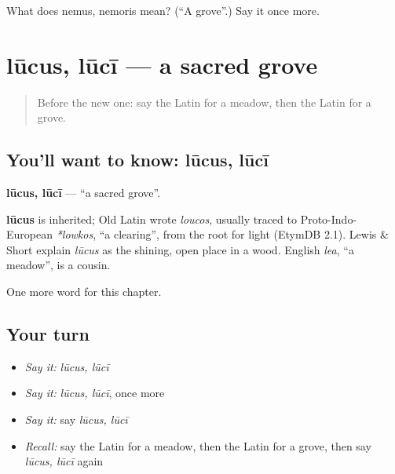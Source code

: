 \begin{tcolorbox}[breakable,colback=teal!4,colframe=teal!35!black,title={Before you move on}]
What does nemus, nemoris mean? (\textquotedblleft{}A grove\textquotedblright{}.) Say it once more.
\end{tcolorbox}
\section[lūcus, lūcī]{lūcus, lūcī — a sacred grove}

\label{lesson:LA-C196-lucus}



\begin{quote}
Before the new one: say the Latin for a meadow, then the Latin for a grove.
\end{quote}

\subsection*{You'll want to know: lūcus, lūcī}
\textbf{lūcus, lūcī} — \textquotedblleft{}a sacred grove\textquotedblright{}.

\begin{cousinweb}
\textbf{lūcus} is inherited; Old Latin wrote \emph{loucos}, usually traced to Proto-Indo-European \emph{*lowkos}, \textquotedblleft{}a clearing\textquotedblright{}, from the root for light (EtymDB 2.1). Lewis \& Short explain \emph{lūcus} as the shining, open place in a wood. English \emph{lea}, \textquotedblleft{}a meadow\textquotedblright{}, is a cousin.
\end{cousinweb}

\begin{grammarlens}[title={What you've built}]
One more word for this chapter.
\end{grammarlens}

\subsection*{Your turn}
\begin{itemize}
\raggedright
  \item \emph{Say it:} \emph{lūcus, lūcī}
  \item \emph{Say it:} \emph{lūcus, lūcī}, once more
  \item \emph{Say it:} say \emph{lūcus, lūcī}
  \item \emph{Recall:} say the Latin for a meadow, then the Latin for a grove, then say \emph{lūcus, lūcī} again
\end{itemize}

